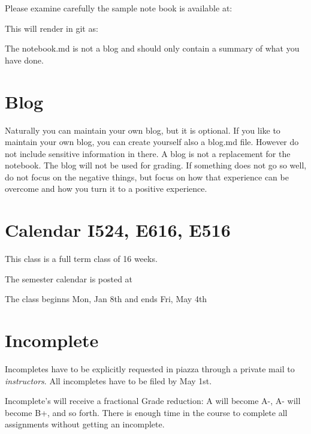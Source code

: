 Please examine carefully the sample note book is available at:


This will render in git as:


The notebook.md is not a blog and should only contain a summary of
what you have done. 

\section{Blog}

Naturally you can maintain your own blog, but it is optional. If you
like to maintain your own blog, you can create yourself also a blog.md
file. However do not include sensitive information in there. A blog is
not a replacement for the notebook. The blog will not be used for
grading. If something does not go so well, do not focus on the negative
things, but focus on how that experience can be overcome and how you
turn it to a positive experience.

\section{Calendar I524, E616, E516}\label{S:calendar}

This class is a full term class of 16 weeks.

\begin{IU}

The semester calendar is posted at 


The class beginns Mon, Jan 8th and ends Fri, May 4th

\end{IU}



\section{Incomplete}\label{incomplete}

Incompletes have to be explicitly requested in piazza through a
private mail to \textit{instructors}. All incompletes have to be filed by
May 1st.

Incomplete's will receive a fractional Grade reduction: A will
become A-, A- will become B+, and so forth. There is enough time in the
course to complete all assignments without getting an incomplete.

